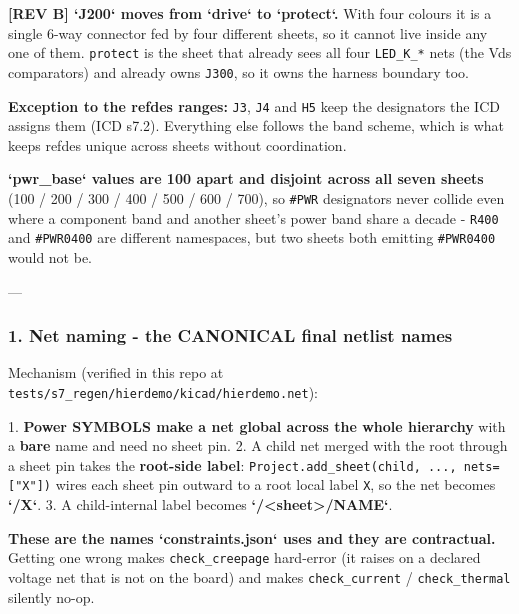\documentclass[11pt,a4paper]{article}
\begin{document}
\textbf{{[}REV B{]} `J200` moves from `drive` to `protect`.} With four colours it is a single 6-way connector fed by four different sheets, so it cannot live inside any one of them. \texttt{protect} is the sheet that already sees all four \texttt{LED\_K\_{*}} nets (the Vds comparators) and already owns \texttt{J300}, so it owns the harness boundary too.

\textbf{Exception to the refdes ranges:} \texttt{J3}, \texttt{J4} and \texttt{H5} keep the designators the ICD assigns them (ICD s7.2). Everything else follows the band scheme, which is what keeps refdes unique across sheets without coordination.

\textbf{`pwr\_base` values are 100 apart and disjoint across all seven sheets} (100 / 200 / 300 / 400 / 500 / 600 / 700), so \texttt{\#PWR} designators never collide even where a component band and another sheet's power band share a decade - \texttt{R400} and \texttt{\#PWR0400} are different namespaces, but two sheets both emitting \texttt{\#PWR0400} would not be.

---

\subsubsection*{1. Net naming - the CANONICAL final netlist names}
Mechanism (verified in this repo at \texttt{tests/s7\_regen/hierdemo/kicad/hierdemo.net}):

1. \textbf{Power SYMBOLS make a net global across the whole hierarchy} with a \textbf{bare} name and need no sheet pin. 2. A child net merged with the root through a sheet pin takes the \textbf{root-side label}: \texttt{Project.add\_sheet(child, ..., nets={[}"X"{]})} wires each sheet pin outward to a root local label \texttt{X}, so the net becomes \textbf{`/X`}. 3. A child-internal label becomes \textbf{`/\textless{}sheet\textgreater{}/NAME`}.

\textbf{These are the names `constraints.json` uses and they are contractual.} Getting one wrong makes \texttt{check\_creepage} hard-error (it raises on a declared voltage net that is not on the board) and makes \texttt{check\_current} / \texttt{check\_thermal} silently no-op.
\end{document}
